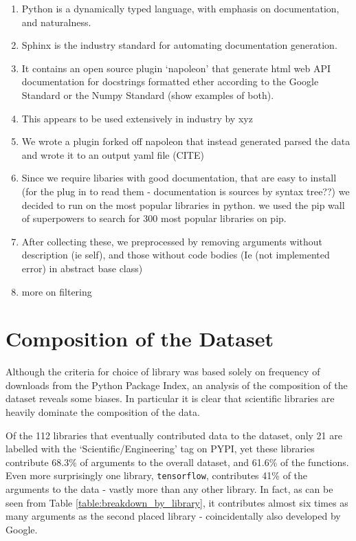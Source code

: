 \begin{enumerate}
    \item Python is a dynamically typed language, with emphasis on documentation, and naturalness.
    \item Sphinx is the industry standard for automating documentation generation.
    \item It contains an open source plugin `napoleon' that generate html web API documentation for docstrings formatted ether according to the Google Standard or the Numpy Standard (show examples of both).
    \item This appears to be used extensively in industry by xyz
    \item We wrote a plugin forked off napoleon that instead generated parsed the data and wrote it to an output yaml file (CITE)
    \item Since we require libaries with good documentation, that are easy to install (for the plug in to read them - documentation is sources by syntax tree??) we decided to run on the most popular libraries in python. we used the pip wall of superpowers to search for 300 most popular libraries on pip.
    \item After collecting these, we preprocessed by removing arguments without description (ie self), and those without code bodies (Ie (not implemented error) in abstract base class)
    \item more on filtering
\end{enumerate}




\section{Composition of the Dataset} %
\label{sec:composition_of_the_dataset}

Although the criteria for choice of library was based solely on frequency of downloads from the Python Package Index, an analysis of the composition of the dataset reveals some biases.
In particular it is clear that scientific libraries are heavily dominate the composition of the data.

Of the 112 libraries that eventually contributed data to the dataset, only 21 are labelled with the `Scientific/Engineering' tag on PYPI, yet these libraries contribute 68.3\% of arguments to the overall dataset, and 61.6\% of the functions. 
Even more surprisingly one library, \texttt{tensorflow}, contributes 41\% of the arguments to the data - vastly more than any other library.
In fact, as can be seen from Table \ref{table:breakdown_by_library}, it contributes almost six times as many arguments as the second placed library - coincidentally also developed by Google. 

